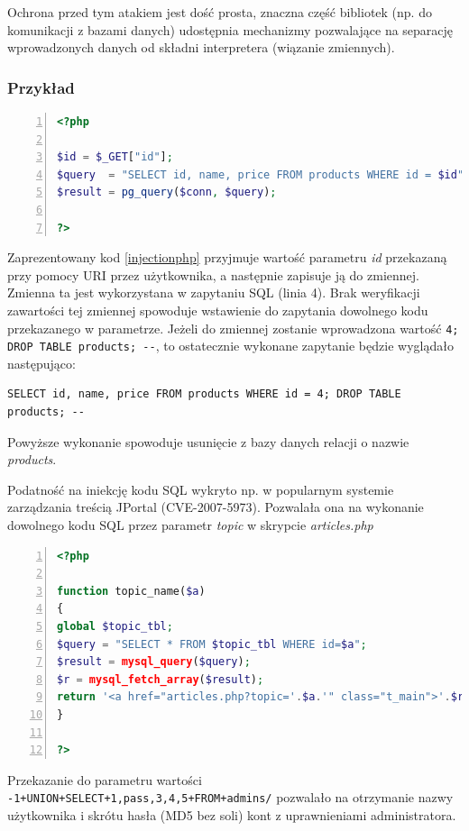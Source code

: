 \documentclass[11pt,a4paper,polish,thesis,oneside]{dcsbook}
\begin{document}
Ochrona przed tym atakiem jest dość prosta, znaczna część bibliotek (np. do komunikacji z bazami danych) udostępnia mechanizmy pozwalające na separację wprowadzonych danych od składni interpretera (wiązanie zmiennych).

\subsubsection*{Przykład}
\begin{lstlisting}[language=php,frame=single,caption=kod podatny na iniekcję,label=injectionphp,numbers=left]
<?php

$id = $_GET["id"];
$query  = "SELECT id, name, price FROM products WHERE id = $id";
$result = pg_query($conn, $query);

?>
\end{lstlisting}
Zaprezentowany kod \ref{injectionphp} przyjmuje wartość parametru \textit{id} przekazaną przy pomocy URI przez użytkownika, a następnie zapisuje ją do zmiennej. Zmienna ta jest wykorzystana w zapytaniu SQL (linia 4). Brak weryfikacji zawartości tej zmiennej spowoduje wstawienie do zapytania dowolnego kodu przekazanego w parametrze. Jeżeli do zmiennej zostanie wprowadzona wartość \lstinline[frame=single]|4; DROP TABLE products; --|, to ostatecznie wykonane zapytanie będzie wyglądało następująco: 
\begin{lstlisting}
SELECT id, name, price FROM products WHERE id = 4; DROP TABLE products; --
\end{lstlisting}
Powyższe wykonanie spowoduje usunięcie z bazy danych relacji o nazwie \textit{products}.

Podatność na iniekcję kodu SQL wykryto np. w popularnym systemie zarządzania treścią JPortal (CVE-2007-5973). Pozwalała ona na wykonanie dowolnego kodu SQL przez parametr \textit{topic} w skrypcie \textit{articles.php}

\begin{lstlisting}[language=php,frame=single,caption=podatność articles.php w systemie JPortal,label=injectionjportal,numbers=left]
<?php

function topic_name($a)  
{     
global $topic_tbl; 
$query = "SELECT * FROM $topic_tbl WHERE id=$a"; 
$result = mysql_query($query);   
$r = mysql_fetch_array($result);     
return '<a href="articles.php?topic='.$a.'" class="t_main">'.$r['title'].'</a>';   
} 

?>
\end{lstlisting}

Przekazanie do parametru wartości \lstinline|-1+UNION+SELECT+1,pass,3,4,5+FROM+admins/| pozwalało na otrzymanie nazwy użytkownika i skrótu hasła (MD5 bez soli) kont z uprawnieniami administratora.
\end{document}
